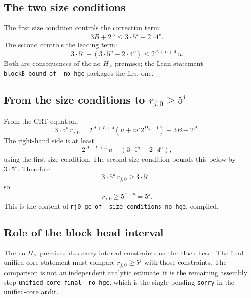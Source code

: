 \subsection{The two size conditions}

The first size condition controls the correction term:
\begin{equation*}
  3B+2^{\Delta}\le3\cdot5^n-2\cdot4^n.
\end{equation*}
The second controls the leading term:
\begin{equation*}
  3\cdot5^s+\left(3\cdot5^n-2\cdot4^n\right)
    \le2^{\Delta+L+4}\,u.
\end{equation*}
Both are consequences of the no-$H_{\ge}$ premises; the Lean statement
\texttt{blockB\_\allowbreak bound\_\allowbreak of\_\allowbreak
no\_\allowbreak hge} packages the first one.

\subsection{From the size conditions to $r_{j,0}\ge5^j$}

From the CRT equation,
\begin{equation*}
  3\cdot5^n\,r_{j,0}
    =2^{\Delta+L+4}\left(u+m'2^{H_s-1}\right)-3B-2^{\Delta}.
\end{equation*}
The right-hand side is at least
\begin{equation*}
  2^{\Delta+L+4}\,u-\left(3\cdot5^n-2\cdot4^n\right),
\end{equation*}
using the first size condition.  The second size condition bounds this
below by $3\cdot5^s$.  Therefore
\begin{equation*}
  3\cdot5^n\,r_{j,0}\ge3\cdot5^s,
\end{equation*}
so
\begin{equation*}
  r_{j,0}\ge5^{s-n}=5^j.
\end{equation*}
This is the content of
\texttt{rj0\_\allowbreak ge\_\allowbreak of\_\allowbreak
size\_\allowbreak conditions\_\allowbreak no\_\allowbreak hge}, compiled.

\subsection{Role of the block-head interval}

The no-$H_{\ge}$ premises also carry interval constraints on the block
head.  The final unified-core statement must compare
$r_{j,0}\ge5^j$ with those constraints.  The comparison is not an
independent analytic estimate: it is the remaining assembly step
\texttt{unified\_\allowbreak core\_\allowbreak final\_\allowbreak
no\_\allowbreak hge}, which is the single pending \texttt{sorry} in the
unified-core audit.

